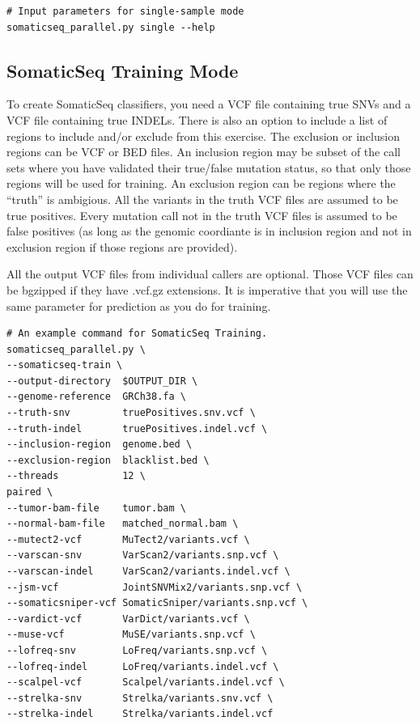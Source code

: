 \documentclass[10pt,letterpaper]{article}
\begin{document}
\begin{sloppypar}
\begin{lstlisting}
# Input parameters for single-sample mode
somaticseq_parallel.py single --help
\end{lstlisting}


\subsection{SomaticSeq Training Mode} \label{somaticseq_train}

To create SomaticSeq classifiers, you need a VCF file containing true SNVs and a VCF file containing true INDELs. There is also an option to include a list of regions to include and/or exclude from this exercise. The exclusion or inclusion regions can be VCF or BED files. An inclusion region may be subset of the call sets where you have validated their true/false mutation status, so that only those regions will be used for training. An exclusion region can be regions where the ``truth'' is ambigious. All the variants in the truth VCF files are assumed to be true positives. Every mutation call not in the truth VCF files is assumed to be false positives (as long as the genomic coordiante is in inclusion region and not in exclusion region if those regions are provided). 

All the output VCF files from individual callers are optional. Those VCF files can be bgzipped if they have .vcf.gz extensions. It is imperative that you will use the same parameter for prediction as you do for training. 

\begin{lstlisting}
# An example command for SomaticSeq Training.
somaticseq_parallel.py \
--somaticseq-train \
--output-directory  $OUTPUT_DIR \
--genome-reference  GRCh38.fa \
--truth-snv         truePositives.snv.vcf \
--truth-indel       truePositives.indel.vcf \
--inclusion-region  genome.bed \
--exclusion-region  blacklist.bed \
--threads           12 \
paired \
--tumor-bam-file    tumor.bam \
--normal-bam-file   matched_normal.bam \
--mutect2-vcf       MuTect2/variants.vcf \
--varscan-snv       VarScan2/variants.snp.vcf \
--varscan-indel     VarScan2/variants.indel.vcf \
--jsm-vcf           JointSNVMix2/variants.snp.vcf \
--somaticsniper-vcf SomaticSniper/variants.snp.vcf \
--vardict-vcf       VarDict/variants.vcf \
--muse-vcf          MuSE/variants.snp.vcf \
--lofreq-snv        LoFreq/variants.snp.vcf \
--lofreq-indel      LoFreq/variants.indel.vcf \
--scalpel-vcf       Scalpel/variants.indel.vcf \
--strelka-snv       Strelka/variants.snv.vcf \
--strelka-indel     Strelka/variants.indel.vcf
\end{lstlisting}


\end{sloppypar}
\end{document}
